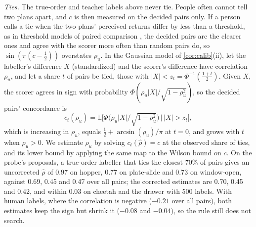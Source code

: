 \documentclass{article}
\theoremstyle{plain}
\theoremstyle{remark}
\newcommand{\E}{\mathbb{E}}
\begin{document}
\emph{Ties.} The true-order and teacher labels above never tie. People often cannot tell two plans apart, and $c$ is
then measured on the decided pairs only. If a person calls a tie when the two plans' perceived returns differ by less
than a threshold, as in threshold models of paired comparison \citep{rao1967ties}, the decided pairs are the clearer
ones and agree with the scorer more often than random pairs do, so $\sin(\pi(c-\frac12))$ overstates $\rho_u$. In the
Gaussian model of \cref{cor:calib}(ii), let the labeller's difference $X$ (standardized) and the scorer's difference have
correlation $\rho_u$, and let a share $t$ of pairs be tied, those with $|X|<z_t=\Phi^{-1}(\frac{1+t}2)$. Given $X$, the
scorer agrees in sign with probability $\Phi(\rho_u|X|/\sqrt{1-\rho_u^2})$, so the decided pairs' concordance is
\[c_t(\rho_u)=\E\big[\Phi\big(\rho_u|X|/\sqrt{1-\rho_u^2}\big)\,\big|\,|X|>z_t\big],\]
which is increasing in $\rho_u$, equals $\frac12+\arcsin(\rho_u)/\pi$ at $t=0$, and grows with $t$ when $\rho_u>0$. We
estimate $\rho_u$ by solving $c_t(\hat\rho)=c$ at the observed share of ties, and its lower bound by applying the same
map to the Wilson bound on $c$. On the probe's proposals, a true-order labeller that ties the closest 70\% of pairs gives
an uncorrected $\hat\rho$ of 0.97 on hopper, 0.77 on plate-slide and 0.73 on window-open, against 0.69, 0.45 and 0.47
over all pairs; the corrected estimates are 0.70, 0.45 and 0.42, and within 0.03 on cheetah and the drawer with 500
labels. With human labels, where the correlation is negative ($-0.21$ over all
pairs), both estimates keep the sign but shrink it ($-0.08$ and $-0.04$), so the rule still does not search.
\end{document}
